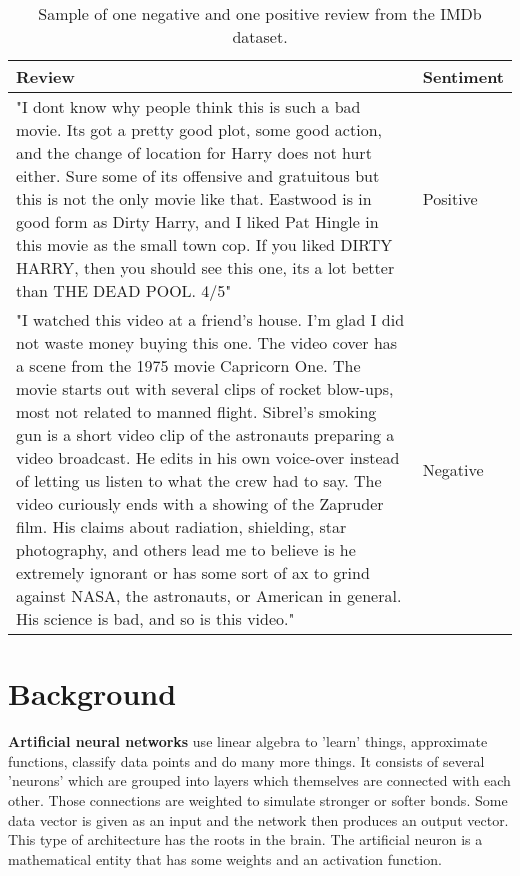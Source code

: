 \documentclass[conference]{IEEEtran}
\theoremstyle{plain}
\theoremstyle{definition}
\theoremstyle{remark}
\begin{document}
\begin{table*}[tbh]
\begin{center}
	\begin{tabular}{ | m{40em} | m{1.5cm}|  } 
		\hline
		\textbf{Review} & \textbf{Sentiment} \\ 
		\hline
		"I dont know why people think this is such a bad movie. Its got a pretty good plot, some good action, and the change of location for Harry does not hurt either. Sure some of its offensive and gratuitous but this is not the only movie like that. Eastwood is in good form as Dirty Harry, and I liked Pat Hingle in this movie as the small town cop. If you liked DIRTY HARRY, then you should see this one, its a lot better than THE DEAD POOL. 4/5" & Positive  \\ 
		\hline
		"I watched this video at a friend's house. I'm glad I did not waste money buying this one. The video cover has a scene from the 1975 movie Capricorn One. The movie starts out with several clips of rocket blow-ups, most not related to manned flight. Sibrel's smoking gun is a short video clip of the astronauts preparing a video broadcast. He edits in his own voice-over instead of letting us listen to what the crew had to say. The video curiously ends with a showing of the Zapruder film. His claims about radiation, shielding, star photography, and others lead me to believe is he extremely ignorant or has some sort of ax to grind against NASA, the astronauts, or American in general. His science is bad, and so is this video." & Negative  \\ 
		\hline
	\end{tabular}
	\caption{Sample of one negative and one positive review from the IMDb dataset.}
	\label{tab:rev}
\end{center}
\end{table*}
\medskip
\section{Background}
\label{sec:background}
\textbf{Artificial neural networks} use linear algebra to 'learn' things, approximate functions, classify data points and do many more things. It consists of several 'neurons' which are grouped into layers which themselves are connected with each other. Those connections are weighted to simulate stronger or softer bonds. Some data vector is given as an input and the network then produces an output vector. This type of architecture has the roots in the brain. The artificial neuron is a mathematical entity that has some weights and an activation function. 
\end{document}
